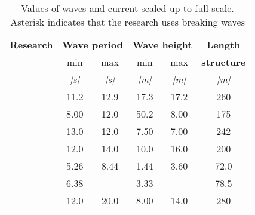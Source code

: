 \begin{table}[]
	\caption{Values of waves and current scaled up to full scale. Asterisk indicates that the research uses breaking waves}
	\begin{tabular}{l|cc|cc|c}
		\textbf{Research}                      & \multicolumn{2}{|c|}{\textbf{Wave period}}           & \multicolumn{2}{c|}{\textbf{Wave height}}           & \textbf{Length} \\ 
		&
		{{min}} & {{max}} & {{min}} & {{max}}          & \textbf{structure} \\ 
		\multicolumn{1}{c|}{\textit{\textbf{}}} & \textit{{{[}s{]}}} & \textit{{{[}s{]}}} & \textit{{{[}m{]}}} & \textit{{{[}m{]}}}   & \textit{{{[}m{]}}} \\ \hline
		\citet{Buchner1995}                            & 11.2                         & 12.9                         & 17.3                         & 17.2                                                & 260                     \\
		\citet{Hamoudi1998}                            & 8.00                          & 12.0                         & 50.2                         & 8.00                                                   & 175                     \\
		\citet{Ersdal2000}                             & 13.0                         & 12.0                         & 7.50                          & 7.00                                                        & 242                     \\
		\citet{Stansberg2001}                         & 12.0                         & 14.0                         & 10.0                         & 16.0                                                      & 200                     \\
		\citet{Ogawa2001}                             & 5.26                          & 8.44                          & 1.44                          & 3.60                        & 72.0                      \\
		\citet{Ogawa2003}                             & 6.38                          & -                          & 3.33                          & -                                                        & 78.5                      \\
		\citet{Soares2005}                             & 12.0                         & 20.0                         & 8.00                          & 14.0                                                      & 280                     \\

\end{tabular}
\end{table}
